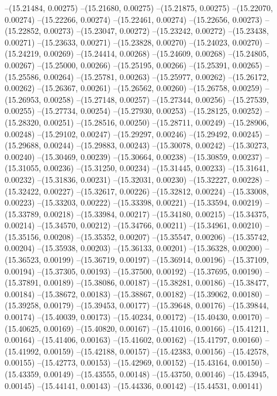 --(15.21484, 0.00275)
--(15.21680, 0.00275)
--(15.21875, 0.00275)
--(15.22070, 0.00274)
--(15.22266, 0.00274)
--(15.22461, 0.00274)
--(15.22656, 0.00273)
--(15.22852, 0.00273)
--(15.23047, 0.00272)
--(15.23242, 0.00272)
--(15.23438, 0.00271)
--(15.23633, 0.00271)
--(15.23828, 0.00270)
--(15.24023, 0.00270)
--(15.24219, 0.00269)
--(15.24414, 0.00268)
--(15.24609, 0.00268)
--(15.24805, 0.00267)
--(15.25000, 0.00266)
--(15.25195, 0.00266)
--(15.25391, 0.00265)
--(15.25586, 0.00264)
--(15.25781, 0.00263)
--(15.25977, 0.00262)
--(15.26172, 0.00262)
--(15.26367, 0.00261)
--(15.26562, 0.00260)
--(15.26758, 0.00259)
--(15.26953, 0.00258)
--(15.27148, 0.00257)
--(15.27344, 0.00256)
--(15.27539, 0.00255)
--(15.27734, 0.00254)
--(15.27930, 0.00253)
--(15.28125, 0.00252)
--(15.28320, 0.00251)
--(15.28516, 0.00250)
--(15.28711, 0.00249)
--(15.28906, 0.00248)
--(15.29102, 0.00247)
--(15.29297, 0.00246)
--(15.29492, 0.00245)
--(15.29688, 0.00244)
--(15.29883, 0.00243)
--(15.30078, 0.00242)
--(15.30273, 0.00240)
--(15.30469, 0.00239)
--(15.30664, 0.00238)
--(15.30859, 0.00237)
--(15.31055, 0.00236)
--(15.31250, 0.00234)
--(15.31445, 0.00233)
--(15.31641, 0.00232)
--(15.31836, 0.00231)
--(15.32031, 0.00230)
--(15.32227, 0.00228)
--(15.32422, 0.00227)
--(15.32617, 0.00226)
--(15.32812, 0.00224)
--(15.33008, 0.00223)
--(15.33203, 0.00222)
--(15.33398, 0.00221)
--(15.33594, 0.00219)
--(15.33789, 0.00218)
--(15.33984, 0.00217)
--(15.34180, 0.00215)
--(15.34375, 0.00214)
--(15.34570, 0.00212)
--(15.34766, 0.00211)
--(15.34961, 0.00210)
--(15.35156, 0.00208)
--(15.35352, 0.00207)
--(15.35547, 0.00206)
--(15.35742, 0.00204)
--(15.35938, 0.00203)
--(15.36133, 0.00201)
--(15.36328, 0.00200)
--(15.36523, 0.00199)
--(15.36719, 0.00197)
--(15.36914, 0.00196)
--(15.37109, 0.00194)
--(15.37305, 0.00193)
--(15.37500, 0.00192)
--(15.37695, 0.00190)
--(15.37891, 0.00189)
--(15.38086, 0.00187)
--(15.38281, 0.00186)
--(15.38477, 0.00184)
--(15.38672, 0.00183)
--(15.38867, 0.00182)
--(15.39062, 0.00180)
--(15.39258, 0.00179)
--(15.39453, 0.00177)
--(15.39648, 0.00176)
--(15.39844, 0.00174)
--(15.40039, 0.00173)
--(15.40234, 0.00172)
--(15.40430, 0.00170)
--(15.40625, 0.00169)
--(15.40820, 0.00167)
--(15.41016, 0.00166)
--(15.41211, 0.00164)
--(15.41406, 0.00163)
--(15.41602, 0.00162)
--(15.41797, 0.00160)
--(15.41992, 0.00159)
--(15.42188, 0.00157)
--(15.42383, 0.00156)
--(15.42578, 0.00155)
--(15.42773, 0.00153)
--(15.42969, 0.00152)
--(15.43164, 0.00150)
--(15.43359, 0.00149)
--(15.43555, 0.00148)
--(15.43750, 0.00146)
--(15.43945, 0.00145)
--(15.44141, 0.00143)
--(15.44336, 0.00142)
--(15.44531, 0.00141)
